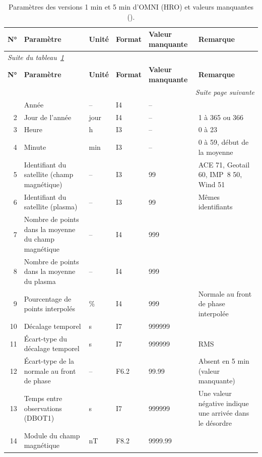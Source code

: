 \begingroup
\footnotesize
\setlength{\tabcolsep}{3pt}
\renewcommand{\arraystretch}{1.1}
\begin{longtable}{r p{5.0cm} p{2.0cm} l l p{3.3cm}}
\caption{Paramètres des versions 1 min et 5 min d'OMNI (HRO) et valeurs manquantes (\cite{OMNI_HRO_doc}).}
\label{tab:annexe_hro}\\
\hline
\textbf{N°} & \textbf{Paramètre} & \textbf{Unité} & \textbf{Format} & \textbf{Valeur manquante} & \textbf{Remarque} \\
\hline
\endfirsthead
\multicolumn{6}{l}{\textit{Suite du tableau~\ref{tab:annexe_hro}}} \\
\hline
\textbf{N°} & \textbf{Paramètre} & \textbf{Unité} & \textbf{Format} & \textbf{Valeur manquante} & \textbf{Remarque} \\
\hline
\endhead
\hline
\multicolumn{6}{r}{\textit{Suite page suivante}} \\
\endfoot
\hline
\endlastfoot
1 & Année & -- & I4 & -- & \\
2 & Jour de l'année & jour & I4 & -- & 1 à 365 ou 366 \\
3 & Heure & h & I3 & -- & 0 à 23 \\
4 & Minute & min & I3 & -- & 0 à 59, début de la moyenne \\
5 & Identifiant du satellite (champ magnétique) & -- & I3 & 99 & ACE 71, Geotail 60, IMP~8 50, Wind 51 \\
6 & Identifiant du satellite (plasma) & -- & I3 & 99 & Mêmes identifiants \\
7 & Nombre de points dans la moyenne du champ magnétique & -- & I4 & 999 & \\
8 & Nombre de points dans la moyenne du plasma & -- & I4 & 999 & \\
9 & Pourcentage de points interpolés & \% & I4 & 999 & Normale au front de phase interpolée \\
10 & Décalage temporel & s & I7 & 999999 & \\
11 & Écart-type du décalage temporel & s & I7 & 999999 & RMS \\
12 & Écart-type de la normale au front de phase & -- & F6.2 & 99.99 & Absent en 5 min (valeur manquante) \\
13 & Temps entre observations (DBOT1) & s & I7 & 999999 & Une valeur négative indique une arrivée dans le désordre \\
14 & Module du champ magnétique & nT & F8.2 & 9999.99 & \\

\end{longtable}
